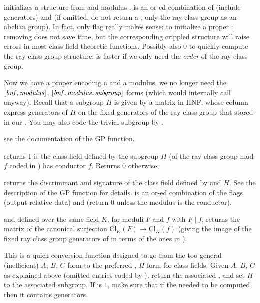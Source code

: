  initializes a 
structure from  and modulus .  is an or-ed
combination of  (include generators) and  (if
omitted, do not return a , only the ray class group as an abelian
group). In fact, only flag really makes sense:  to
initialize a proper : removing  does not save time, but
the corresponding crippled  structure will raise errors in most
class field theoretic functions. Possibly also 0 to quickly compute the ray
class group structure;  is faster if we only need the
\emph{order} of the ray class group.

Now we have a proper  encoding a  and a modulus, we no longer
need the $[\hbox{\it bnf\/},\hbox{\it modulus\/}]$,
$[\hbox{\it bnf\/},\hbox{\it modulus\/},\hbox{\it subgroup\/}]$ forms (which would internally call
 anyway). Recall that a subgroup $H$ is given by a matrix in HNF,
whose column express generators of $H$ on the fixed generators of the ray class
group that stored in our . You may also code the trivial subgroup by
.

 see the documentation of
the GP function.

 returns 1 is the class field
defined by the subgroup $H$ (of the ray class group mod $f$ coded in )
has conductor $f$. Returns 0 otherwise.

 returns the discriminant and
signature of the class field defined by  and $H$. See the description
of the GP function for details. \fl is an or-ed combination of the flags
 (output relative data) and  (return 0 unless the
modulus is the conductor).

  and 
defined over the same field $K$, for moduli $F$ and $f$ with
$F\mid f$, returns the matrix of the canonical surjection
$\text{Cl}_K(F)\to \text{Cl}_K(f)$ (giving the image of the fixed ray class
group generators of  in terms of the ones in ).

 This is a
quick conversion function designed to go from the too general (inefficient)
$A$, $B$, $C$ form to the preferred , $H$ form for class fields.
Given $A$, $B$, $C$ as explained above (omitted entries coded by ),
return the associated , and set $H$ to the associated subgroup. If
 is $1$, make sure that if the  needed to be computed,
then it contains generators.

